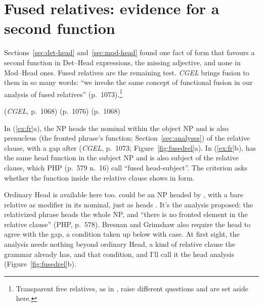 %

\section{Fused relatives: evidence for a second function}\label{sec:fused-relatives}

Sections~\ref{sec:det-head} and~\ref{sec:mod-head} found one fact of form that favours a second function in Det--Head expressions, the missing adjective, and none in Mod--Head ones. Fused relatives are the remaining test. \textit{CGEL} brings fusion to them in so many words: \enquote{we invoke the same concept of functional fusion in our analysis of fused relatives} (p.~1073).\footnote{Transparent free relatives, as in  \citep[248]{grosu-2003-unified-theory-tfrs}, raise different questions and are set aside here.}

\ea\label{ex:fr}
\ea {} (\textit{CGEL}, p.~1068)
\ex {} (p.~1076)
\ex {} (p.~1068)
\z\z

In (\ref{ex:fr}a), the NP  heads the nominal within the object NP and is also prenucleus (the fronted phrase's function; Section~\ref{sec:analyses}) of the relative clause, with a gap after  (\textit{CGEL}, p.~1073; Figure~\ref{fig:fusedrel}a). In (\ref{ex:fr}b),  has the same head function in the subject NP and is also subject of the relative clause, which PHP (p.~579 n.~16) call \enquote{fused head-subject}. The criterion asks whether the function inside the relative clause shows in form.

Ordinary Head is available here too.  could be an NP headed by , with a bare relative as modifier in its nominal, just as  heads . It's the analysis \textcite{bresnan1978free} proposed: the relativized phrase heads the whole NP, and \enquote{there is no fronted element in the relative clause} (PHP, p.~578). Bresnan and Grimshaw also require the head to agree with the gap, a condition taken up below with case. At first sight, the analysis needs nothing beyond ordinary Head, a kind of relative clause the grammar already has, and that condition, and I'll call it the head analysis (Figure~\ref{fig:fusedrel}b).

